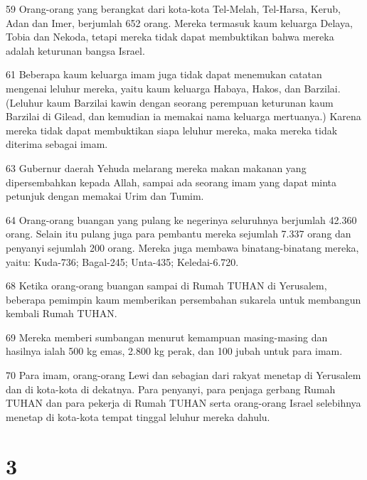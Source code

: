 \par 59 Orang-orang yang berangkat dari kota-kota Tel-Melah, Tel-Harsa, Kerub, Adan dan Imer, berjumlah 652 orang. Mereka termasuk kaum keluarga Delaya, Tobia dan Nekoda, tetapi mereka tidak dapat membuktikan bahwa mereka adalah keturunan bangsa Israel.
\par 61 Beberapa kaum keluarga imam juga tidak dapat menemukan catatan mengenai leluhur mereka, yaitu kaum keluarga Habaya, Hakos, dan Barzilai. (Leluhur kaum Barzilai kawin dengan seorang perempuan keturunan kaum Barzilai di Gilead, dan kemudian ia memakai nama keluarga mertuanya.) Karena mereka tidak dapat membuktikan siapa leluhur mereka, maka mereka tidak diterima sebagai imam.
\par 63 Gubernur daerah Yehuda melarang mereka makan makanan yang dipersembahkan kepada Allah, sampai ada seorang imam yang dapat minta petunjuk dengan memakai Urim dan Tumim.
\par 64 Orang-orang buangan yang pulang ke negerinya seluruhnya berjumlah 42.360 orang. Selain itu pulang juga para pembantu mereka sejumlah 7.337 orang dan penyanyi sejumlah 200 orang. Mereka juga membawa binatang-binatang mereka, yaitu: Kuda-736; Bagal-245; Unta-435; Keledai-6.720.
\par 68 Ketika orang-orang buangan sampai di Rumah TUHAN di Yerusalem, beberapa pemimpin kaum memberikan persembahan sukarela untuk membangun kembali Rumah TUHAN.
\par 69 Mereka memberi sumbangan menurut kemampuan masing-masing dan hasilnya ialah 500 kg emas, 2.800 kg perak, dan 100 jubah untuk para imam.
\par 70 Para imam, orang-orang Lewi dan sebagian dari rakyat menetap di Yerusalem dan di kota-kota di dekatnya. Para penyanyi, para penjaga gerbang Rumah TUHAN dan para pekerja di Rumah TUHAN serta orang-orang Israel selebihnya menetap di kota-kota tempat tinggal leluhur mereka dahulu.

\chapter{3}

